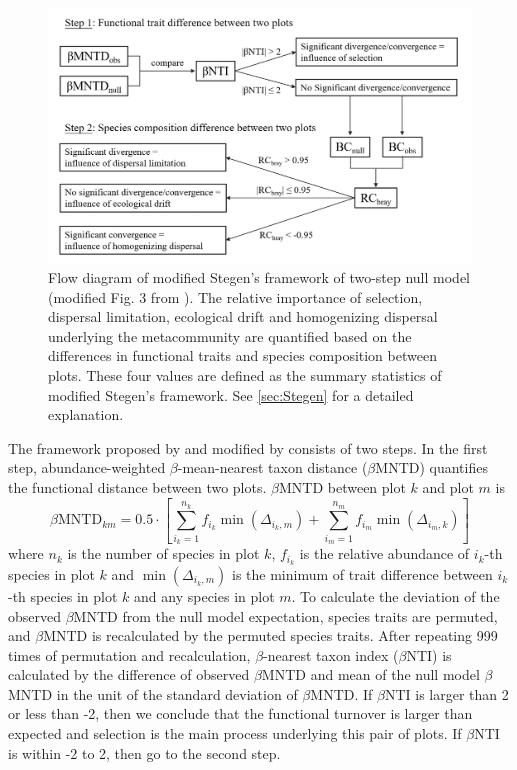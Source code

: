 	\begin{figure}
		\centering
		\includegraphics[width=\linewidth]{./figures/ppt/Stegen.png}
		\caption[Flow diagram of modified Stegen's framework of two-step null model.]{\small
			Flow diagram of modified Stegen's framework of two-step null model (modified Fig. 3 from \citet{stegen2013quantifying}). The relative importance of selection, dispersal limitation, ecological drift and homogenizing dispersal underlying the metacommunity are quantified based on the differences in functional traits and species composition between plots. These four values are defined as the summary statistics of modified Stegen's framework. See \autoref{sec:Stegen} for a detailed explanation.}
		\label{fig:stegen}
	\end{figure}
	
	
	The framework proposed by \citet{stegen2013quantifying} and modified by \citet{ford2020functional} consists of two steps. In the first step, abundance-weighted $\beta$-mean-nearest taxon distance ($\beta$MNTD) quantifies the functional distance between two plots. $\beta$MNTD between plot $k$ and plot $m$ is 
	\[
	\beta \text{MNTD}_{km} = 0.5\cdot \left[\sum_{i_k = 1}^{n_k} f_{i_k}\min(\Delta_{i_k,m}) + \sum_{i_m = 1}^{n_m} f_{i_m}\min(\Delta_{i_m,k})\right]
	\]
	where $n_k$ is the number of species in plot $k$, $f_{i_k}$ is the relative abundance of $i_k$-th species in plot $k$ and $\min(\Delta_{i_k,m})$ is the minimum of trait difference between $i_k$-th species in plot $k$ and any species in plot $m$. To calculate the deviation of the observed $\beta$MNTD from the null model expectation, species traits are permuted, and $\beta$MNTD is recalculated by the permuted species traits. After repeating 999 times of permutation and recalculation, $\beta$-nearest taxon index ($\beta$NTI) is calculated by the difference of observed $\beta$MNTD and mean of the null model $\beta$MNTD in the unit of the standard deviation of $\beta$MNTD. If $\beta$NTI is larger than 2 or less than -2, then we conclude that the functional turnover is larger than expected and selection is the main process underlying this pair of plots. If $\beta$NTI is within -2 to 2, then go to the second step.
	
